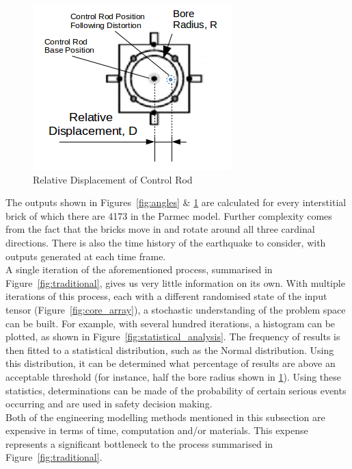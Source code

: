 \begin{figure}[ht!]
	\centering
	\includegraphics[scale=0.5]{Figures/bore_displacement}
	\caption{Relative Displacement of Control Rod}
	\label{fig:bore_clearance}
\end{figure}

\noindent
The outputs shown in Figures~\ref{fig:angles} \& \ref{fig:bore_clearance} are calculated for every interstitial brick of which there are 4173 in the Parmec model. Further complexity comes from the fact that the bricks move in and rotate around all three cardinal directions. There is also the time history of the earthquake to consider, with outputs generated at each time frame. 
\\

\noindent
A single iteration of the aforementioned process, summarised in Figure~\ref{fig:traditional}, gives us very little information on its own. With multiple iterations of this process, each with a different randomised state of the input tensor (Figure~\ref{fig:core_array}), a stochastic  understanding of the problem space can be built. For example, with several hundred iterations, a histogram can be plotted, as shown in Figure~\ref{fig:statistical_analysis}. The frequency of results is then fitted to a statistical distribution, such as the Normal distribution. Using this distribution, it can be determined what percentage of results are above an acceptable threshold (for instance, half the bore radius shown in \ref{fig:bore_clearance}). Using these statistics, determinations can be made of the probability of certain serious events occurring and are used in safety decision making.\\

\noindent
Both of the engineering modelling methods mentioned in this subsection are expensive in terms of time, computation and/or materials. This expense represents a significant bottleneck to the process summarised in Figure~\ref{fig:traditional}.\\


